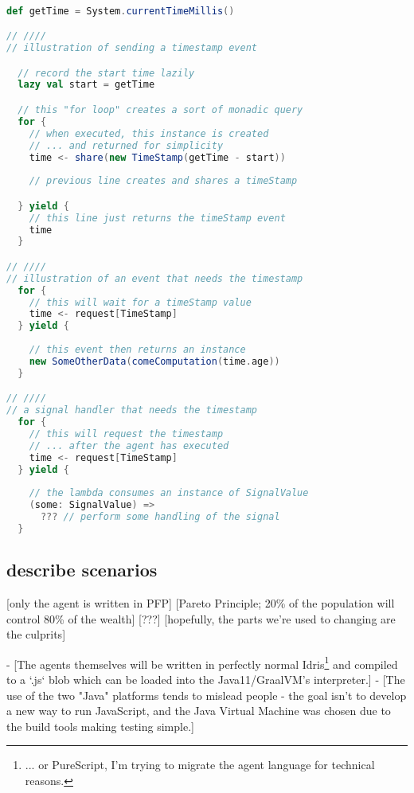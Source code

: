\begin{lstlisting}[caption={Scala for-yield to interact with the agent}, label={lst:depa},basicstyle=\small,language=Scala]

def getTime = System.currentTimeMillis()

// ////
// illustration of sending a timestamp event

  // record the start time lazily
  lazy val start = getTime

  // this "for loop" creates a sort of monadic query
  for {
    // when executed, this instance is created
    // ... and returned for simplicity
    time <- share(new TimeStamp(getTime - start))
    
    // previous line creates and shares a timeStamp

  } yield {
    // this line just returns the timeStamp event
    time
  }

// ////
// illustration of an event that needs the timestamp
  for {
    // this will wait for a timeStamp value
    time <- request[TimeStamp]
  } yield {
    
    // this event then returns an instance
    new SomeOtherData(comeComputation(time.age))
  }

// ////
// a signal handler that needs the timestamp
  for {
    // this will request the timestamp
    // ... after the agent has executed
    time <- request[TimeStamp]
  } yield {
    
    // the lambda consumes an instance of SignalValue
    (some: SignalValue) =>
      ??? // perform some handling of the signal
  }

\end{lstlisting}



\subsection{describe scenarios}

[only the agent is written in PFP]
    [Pareto Principle; 20\% of the population will control 80\% of the wealth]
    [???]
    [hopefully, the parts we're used to changing are the culprits]

- [The agents themselves will be written in perfectly normal Idris\footnote{... or PureScript, I'm trying to migrate the agent language for technical reasons.} and compiled to a `.js` blob which can be loaded into the Java11/GraalVM's interpreter.]
    - [The use of the two "Java" platforms tends to mislead people - the goal isn't to develop a new way to run JavaScript, and the Java Virtual Machine was chosen due to the build tools making testing simple.]



